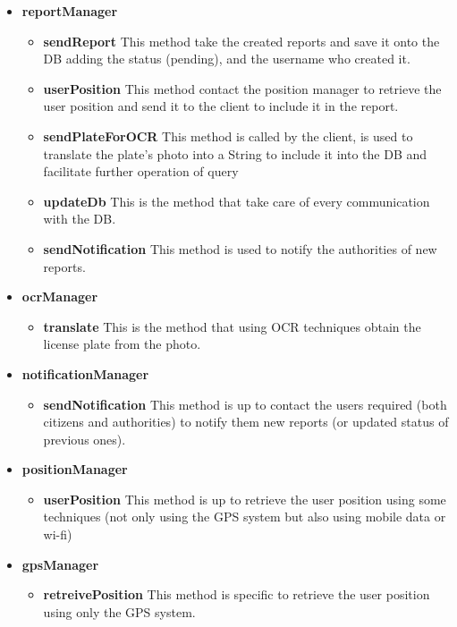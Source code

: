 \documentclass[12pt,a4paper]{report}
\begin{document}
				\begin{itemize}
					\item \textbf{reportManager}
					\begin{itemize}
						\item \textbf{sendReport} This method take the created reports and save it onto the DB adding
						the status (pending), and the username who created it.
						\item \textbf{userPosition} This method contact the position manager to retrieve the user
						position and send it to the client to include it in the report.
						\item \textbf{sendPlateForOCR} This method is called by the client, is used to translate the
						plate's photo into a String to include it into the DB and facilitate further operation of query
						\item \textbf{updateDb} This is the method that take care of every communication with the DB.
						\item \textbf{sendNotification} This method is used to notify the authorities of new reports.
					\end{itemize}
					\item \textbf{ocrManager}
					\begin{itemize}
						\item \textbf{translate} This is the method that using OCR techniques obtain the license plate
						from the photo.
					\end{itemize}
					\newpage \item \textbf{notificationManager}
					\begin{itemize}
						\item \textbf{sendNotification}  This method is up to contact the users required (both citizens
						and authorities) to notify them new reports (or updated status of previous ones).
					\end{itemize}
					\item \textbf{positionManager}
					\begin{itemize}
						\item \textbf{userPosition} This method is up to retrieve the user position using some techniques
						(not only using the GPS system but also using mobile data or wi-fi)
					\end{itemize}
					\item \textbf{gpsManager}
					\begin{itemize}
						\item \textbf{retreivePosition} This method is specific to retrieve the user position using only the
							GPS system.
					\end{itemize}
				\end{itemize}
\end{document}
